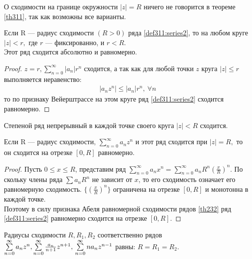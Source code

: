 \begin{remark}
  О сходимости на границе окружности $|z| = R$ ничего не говорится в теореме
  \eqref{th311}, так как возможны все варианты.
\end{remark}

\begin{theorem}
  \label{th312}
  Если R --- радиус сходимости $(R > 0)$ ряда \eqref{def311:series2}, то на любом
  круге $|z| < r, $ где $r$ --- фиксированно, и $r < R$. \\
  Этот ряд сходится абсолютно и равномерно.
\end{theorem}

\begin{proof}
  $z = r, \sum\limits_{n = 0}^{\infty} |a_n| r^n$ сходится, а так как для любой
  точки $z$ круга $|z| \leq r$ выполняется неравенство:
  \begin{gather*}
    |a_n z^n| \leq |a_n| r^n, \ \forall n
  \end{gather*}
  то по признаку Вейерштрассе на этом круге ряд \eqref{def311:series2} сходится
  равномерно.
\end{proof}

\begin{consequence}
  Степеной ряд непрерывный в каждой точке своего круга $|z| < R$ сходится.
\end{consequence}

\begin{theorem}[2-ая т. Абеля]
  \label{th313}
  Если R --- радиус сходимости, $\sum\limits_{n = 0}^{\infty} a_n z^n$ и этот
  ряд сходится при $|z| = R,$ то он сходится на отрезке $[0, R]$ равномерно.
\end{theorem}

\begin{proof}
  Пусть $0 \leq x \leq R$, представим ряд $\sum\limits_{n = 0}^{\infty} a_n x^n
  = \sum\limits_{n = 0}^{\infty} a_n R^n\left(\frac{x}{R}\right)^n$. По скольку
  члены ряда $\sum a_n R^n$ не зависит от $x$, то его сходимость означает его
  равномерную сходимость. $\{(\frac{x}{R})^n\}$ ограничена на отрезке $[0, R]$
  и монотонна в каждой точке. \\
  Поэтому в силу признака Абеля равномерной сходимости рядов \eqref{th232} ряд
  \eqref{def311:series2} равномерно сходится на отрезке $[0, R]$.
\end{proof}

\begin{lemma}
  \label{ch3:lemma1}
  Радиусы сходимости $R, R_1, R_2$ соответственно рядов
  $\sum\limits_{n = 0}^{\infty} a_n z^n, \sum\limits_{n = 0}^{\infty}
  \frac{a_n}{n + 1} z^{n+1}, \\ \sum\limits_{n = 0}^{\infty} n a_n z^{n - 1}$
  равны: $R = R_1 = R_2$.
\end{lemma}

